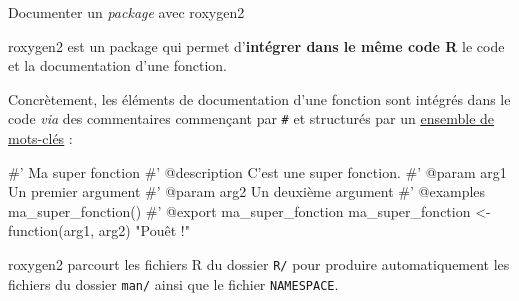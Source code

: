 \documentclass[12pt,handout,ignorenonframetext,]{beamer}
\newenvironment{Shaded}{}{}
\newcommand{\StringTok}[1]{\textcolor[rgb]{0.00,0.50,0.50}{#1}}
\newcommand{\CommentTok}[1]{\textcolor[rgb]{0.00,0.50,0.00}{#1}}
\newcommand{\ControlFlowTok}[1]{\textcolor[rgb]{0.00,0.00,1.00}{#1}}
\newcommand{\NormalTok}[1]{#1}
\renewenvironment{Shaded}{\begin{snugshade}}{\end{snugshade}}
\begin{document}
\begin{frame}[fragile]{Documenter un \emph{package} avec roxygen2}

roxygen2 est un package qui permet d'\textbf{intégrer dans le même code
R} le code et la documentation d'une fonction.

\pause Concrètement, les éléments de documentation d'une fonction sont
intégrés dans le code \emph{via} des commentaires commençant par
\texttt{\#\textquotesingle{}} et structurés par un
\href{(https://cran.r-project.org/web/packages/roxygen2/vignettes/rd.html)}{\underline{ensemble de mots-clés}}
:

\footnotesize \pause

\begin{Shaded}
\begin{Highlighting}[]
\CommentTok{#' Ma super fonction}
\CommentTok{#' @description C'est une super fonction.}
\CommentTok{#' @param arg1 Un premier argument}
\CommentTok{#' @param arg2 Un deuxième argument}
\CommentTok{#' @examples ma_super_fonction()}
\CommentTok{#' @export ma_super_fonction}
\NormalTok{ma_super_fonction <-}\StringTok{ }\ControlFlowTok{function}\NormalTok{(arg1, arg2) }\StringTok{"Pouêt !"}
\end{Highlighting}
\end{Shaded}

\pause \normalsize \vspace{-0.2cm} roxygen2 parcourt les fichiers R du
dossier \texttt{R/} pour produire automatiquement les fichiers du
dossier \texttt{man/} ainsi que le fichier \texttt{NAMESPACE}.

\end{frame}
\end{document}
